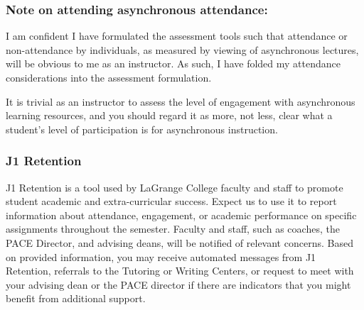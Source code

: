 \documentclass[11pt]{article}
\begin{document}
\subsubsection*{Note on attending asynchronous attendance:}

I am confident I have formulated the assessment tools such that attendance or non-attendance by individuals, as measured by viewing of asynchronous lectures, will be obvious to me as an instructor. As such, I have folded my attendance considerations into the assessment formulation.

\skip

It is trivial as an instructor to assess the level of engagement with asynchronous learning resources, and you should regard it as more, not less, clear what a student's level of participation is for asynchronous instruction.

\subsubsection*{J1 Retention}

J1 Retention is a tool used by LaGrange College faculty and staff to promote student academic and extra-curricular success. Expect us to use it to report information about attendance, engagement, or academic performance on specific assignments throughout the semester. Faculty and staff, such as coaches, the PACE Director, and advising deans, will be notified of relevant concerns. Based on provided information, you may receive automated messages from J1 Retention, referrals to the Tutoring or Writing Centers, or request to meet with your advising dean or the PACE director if there are indicators that you might benefit from additional support. 
\end{document}
